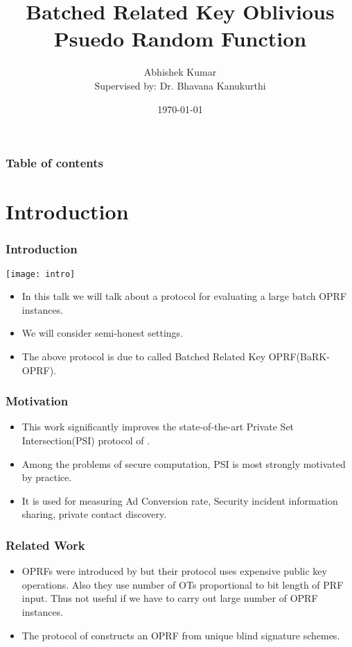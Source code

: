 \documentclass[hyperref={pdfpagelabels=false}]{beamer}
\title{Batched Related Key Oblivious Psuedo Random Function}
\author[Abhishek Kumar]{Abhishek Kumar\\{\small Supervised by: Dr. Bhavana Kanukurthi}}
\date{\today}
\theoremstyle{remark}
\begin{document}
\begin{frame}
\titlepage
\end{frame} 


\begin{frame}
\frametitle{Table of contents}
\tableofcontents
\end{frame} 


\section{Introduction} 
\begin{frame}
\frametitle{Introduction} 
\begin{center}
\texttt{[image: intro]}\pause
\end{center}
\begin{itemize}
\item In this talk we will talk about a protocol for evaluating a large batch OPRF instances. \pause
\item We will consider semi-honest settings.\pause
\item The above protocol is due to \cite{KKRT} called Batched Related Key OPRF(BaRK-OPRF).
\end{itemize}
\end{frame}

\begin{frame}
\frametitle{Motivation}
\begin{itemize}
\item This work significantly improves the state-of-the-art Private Set Intersection(PSI) protocol of \cite{PSSZ}.\pause
\item Among the problems of secure computation, PSI is most strongly motivated by practice.\smiley{} \pause
\item It is used for measuring Ad Conversion rate, Security incident information sharing, private contact discovery.\pause

\end{itemize}
 
\end{frame}

\begin{frame}
\frametitle{Related Work}
\begin{itemize}
\item OPRFs were introduced by \cite{FIPR} but their protocol uses expensive public key operations. Also they use number of OTs proportional to bit length of PRF input. Thus not useful if we have to carry out large number of OPRF instances.\frownie \pause
\item The protocol of \cite{CNS} constructs an OPRF from unique blind signature schemes.
\end{itemize}
\end{frame}
\end{document}
